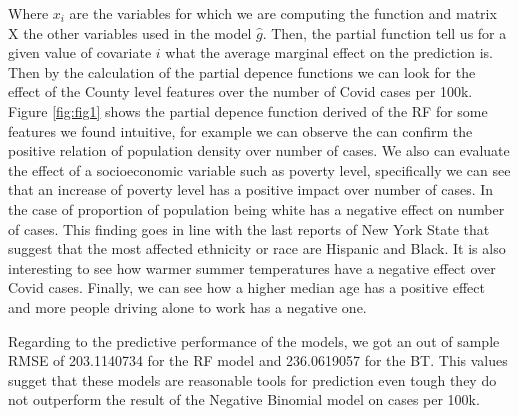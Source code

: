 \documentclass[
]{article}
\begin{document}
Where \(x_i\) are the variables for which we are computing the function
and matrix X the other variables used in the model \(\hat{g}\). Then,
the partial function tell us for a given value of covariate \(i\) what
the average marginal effect on the prediction is. Then by the
calculation of the partial depence functions we can look for the effect
of the County level features over the number of Covid cases per 100k.
Figure \ref{fig:fig1} shows the partial depence function derived of the
RF for some features we found intuitive, for example we can observe the
can confirm the positive relation of population density over number of
cases. We also can evaluate the effect of a socioeconomic variable such
as poverty level, specifically we can see that an increase of poverty
level has a positive impact over number of cases. In the case of
proportion of population being white has a negative effect on number of
cases. This finding goes in line with the last reports of New York State
that suggest that the most affected ethnicity or race are Hispanic and
Black. It is also interesting to see how warmer summer temperatures have
a negative effect over Covid cases. Finally, we can see how a higher
median age has a positive effect and more people driving alone to work
has a negative one.

Regarding to the predictive performance of the models, we got an out of
sample RMSE of 203.1140734 for the RF model and 236.0619057 for the BT.
This values sugget that these models are reasonable tools for prediction
even tough they do not outperform the result of the Negative Binomial
model on cases per 100k.
\end{document}
